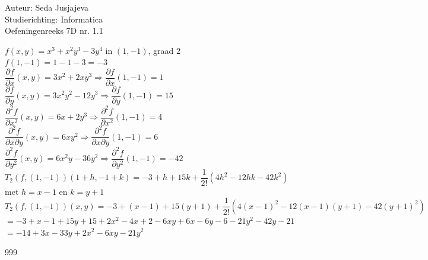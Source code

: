 \documentclass[a4paper]{article}
\begin{document}
\noindent \large Auteur: Seda Jusjajeva\\
\noindent \large Studierichting: Informatica\\
\noindent \large Oefeningenreeks 7D nr. 1.1\\

\medskip

\normalsize


$f(x, y) = x^3 + x^2y^3 - 3y^4$ in $(1, -1)$, graad $2$ \\

$f(1, -1) = 1 - 1 - 3 = -3$ \\

$\dfrac{\partial f}{\partial x}(x, y) = 3x^2 + 2xy^3 \Rightarrow \dfrac{\partial f}{\partial x}(1, -1) = 1$ \\

$\dfrac{\partial f}{\partial y}(x, y) = 3x^2y^2 - 12y^3 \Rightarrow \dfrac{\partial f}{\partial y}(1, -1) = 15$ \\

$\dfrac{\partial^2 f}{\partial x^2}(x, y) = 6x + 2y^3 \Rightarrow \dfrac{\partial^2 f}{\partial x^2}(1, -1) = 4$ \\

$\dfrac{\partial^2 f}{\partial x\partial y}(x, y) = 6xy^2 \Rightarrow \dfrac{\partial^2 f}{\partial x\partial y}(1, -1) = 6$ \\

$\dfrac{\partial^2 f}{\partial y^2}(x, y) = 6x^2y - 36y^2 \Rightarrow \dfrac{\partial^2 f}{\partial y^2}(1, -1) = -42$ \\

$T_2(f,(1, -1))(1 + h, -1 + k) = -3 + h + 15k + \dfrac{1}{2!}\left(4h^2 - 12hk -42k^2\right)$ met $h = x - 1$ en $k = y + 1$ \\

$T_2(f,(1, -1))(x, y) = -3 + (x - 1) + 15(y + 1) + \dfrac{1}{2!}\left(4(x - 1)^2 - 12(x - 1)(y + 1) -42(y + 1)^2\right)$ \\

$= -3 + x - 1 + 15y + 15 + 2x^2 - 4x + 2 - 6xy + 6x - 6y - 6 - 21y^2 - 42y - 21$ \\

$= -14 + 3x - 33y + 2x^2 - 6xy - 21y^2$ \\




\begin{thebibliography}{999}
\end{thebibliography}
\end{document}
